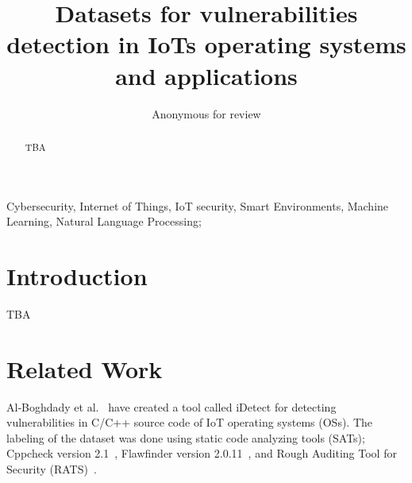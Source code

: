 \documentclass[conference]{IEEEtran}
\begin{document}
%
\title{Datasets for vulnerabilities detection in IoTs operating systems and applications}

\author{
    Anonymous for review
}

\IEEEoverridecommandlockouts


\maketitle  

\IEEEpubidadjcol

\begin{abstract}
TBA
\end{abstract}

\begin{IEEEkeywords}
Cybersecurity, Internet of Things, IoT security, Smart Environments, 
Machine Learning, Natural Language Processing;
\end{IEEEkeywords}


\section{Introduction}

TBA 

\section{Related Work}

Al‑Boghdady et al.~\cite{al-boghdady2022:idetect} have created a tool called iDetect for detecting 
vulnerabilities in C/C++ source code of IoT operating systems (OSs). 
The labeling of the dataset was done using static code analyzing tools (SATs);
Cppcheck version 2.1~\cite{cppcheck2.12021:tool}, 
Flawfinder version 2.0.11~\cite{dwheeler2021:flawfinder}, 
and Rough Auditing Tool for Security (RATS)~\cite{rats2021:rough}.
\end{document}
